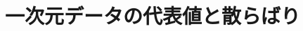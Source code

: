 \documentclass[../../topic_statistics]{subfiles}
\begin{document}
\chapter{一次元データの代表値と散らばり}






\end{document}
